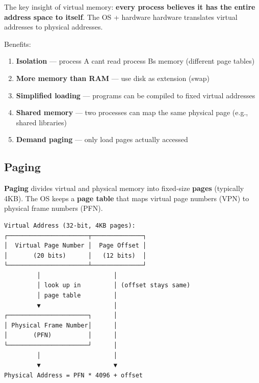 \documentclass[11pt]{article}
\providecommand{\tightlist}{\setlength{\itemsep}{1pt}\setlength{\parskip}{0pt}}
\begin{document}
The key insight of virtual memory: \textbf{every process believes it has the entire address space to itself}. The OS + hardware hardware translates virtual addresses to physical addresses.

Benefits:

\begin{enumerate}
\def\labelenumi{\arabic{enumi}.}
\tightlist
\item
  \textbf{Isolation} --- process A can\textquotesingle t read process B\textquotesingle s memory (different page tables)
\item
  \textbf{More memory than RAM} --- use disk as extension (swap)
\item
  \textbf{Simplified loading} --- programs can be compiled to fixed virtual addresses
\item
  \textbf{Shared memory} --- two processes can map the same physical page (e.g., shared libraries)
\item
  \textbf{Demand paging} --- only load pages actually accessed
\end{enumerate}


\subsection{Paging}\label{paging}

\textbf{Paging} divides virtual and physical memory into fixed-size \textbf{pages} (typically 4KB). The OS keeps a \textbf{page table} that maps virtual page numbers (VPN) to physical frame numbers (PFN).

\setcodelang{}

\begin{verbatim}
Virtual Address (32-bit, 4KB pages):
┌──────────────────────┬──────────────┐
│  Virtual Page Number │  Page Offset │
│       (20 bits)      │   (12 bits)  │
└──────────────────────┴──────────────┘
         │                    │
         │ look up in         │ (offset stays same)
         │ page table         │
         ▼                    │
┌──────────────────────┐      │
│ Physical Frame Number│      │
│       (PFN)          │      │
└──────────────────────┘      │
         │                    │
         ▼                    ▼
Physical Address = PFN * 4096 + offset
\end{verbatim}
\end{document}
